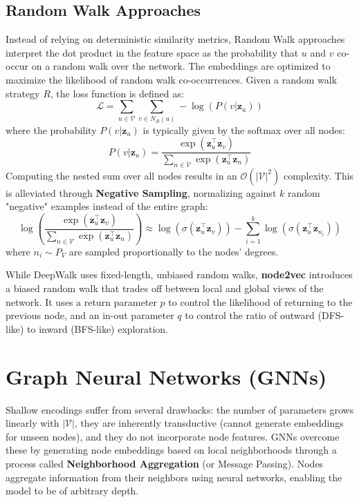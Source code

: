 \subsection{Random Walk Approaches}
Instead of relying on deterministic similarity metrics, Random Walk approaches interpret the dot product in the feature space as the probability that $u$ and $v$ co-occur on a random walk over the network. 
The embeddings are optimized to maximize the likelihood of random walk co-occurrences. Given a random walk strategy $R$, the loss function is defined as:
\begin{equation}
    \mathcal{L} = \sum_{u \in \mathcal{V}} \sum_{v \in N_R(u)} - \log \left( P(v | \mathbf{z}_u) \right)
\end{equation}
where the probability $P(v | \mathbf{z}_u)$ is typically given by the softmax over all nodes:
\begin{equation}
    P(v | \mathbf{z}_u) = \frac{\exp(\mathbf{z}_u^\top \mathbf{z}_v)}{\sum_{n \in \mathcal{V}} \exp(\mathbf{z}_u^\top \mathbf{z}_n)}
\end{equation}
Computing the nested sum over all nodes results in an $\mathcal{O}(|\mathcal{V}|^2)$ complexity. This is alleviated through \textbf{Negative Sampling}, normalizing against $k$ random "negative" examples instead of the entire graph:
\begin{equation}
    \log \left( \frac{\exp(\mathbf{z}_u^\top \mathbf{z}_v)}{\sum_{n \in \mathcal{V}} \exp(\mathbf{z}_u^\top \mathbf{z}_n)} \right) \approx \log(\sigma(\mathbf{z}_u^\top \mathbf{z}_v)) - \sum_{i=1}^k \log(\sigma(\mathbf{z}_u^\top \mathbf{z}_{n_i}))
\end{equation}
where $n_i \sim P_V$ are sampled proportionally to the nodes' degrees.

\begin{insightbox}
While DeepWalk uses fixed-length, unbiased random walks, \textbf{node2vec} introduces a biased random walk that trades off between local and global views of the network. It uses a return parameter $p$ to control the likelihood of returning to the previous node, and an in-out parameter $q$ to control the ratio of outward (DFS-like) to inward (BFS-like) exploration.
\end{insightbox}

\section{Graph Neural Networks (GNNs)}
Shallow encodings suffer from several drawbacks: the number of parameters grows linearly with $|\mathcal{V}|$, they are inherently transductive (cannot generate embeddings for unseen nodes), and they do not incorporate node features. 
GNNs overcome these by generating node embeddings based on local neighborhoods through a process called \textbf{Neighborhood Aggregation} (or Message Passing). Nodes aggregate information from their neighbors using neural networks, enabling the model to be of arbitrary depth. 


